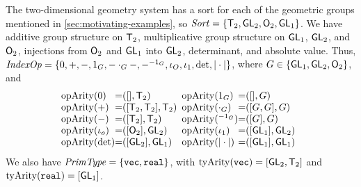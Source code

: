 \begin{example}
  \label{ex:two-dim-geo-operations}
  The two-dimensional geometry system has a sort for each of the
  geometric groups mentioned in \autoref{sec:motivating-examples}, so
  $\mathit{Sort} = \{\mathsf{T}_2, \mathsf{GL}_2, \mathsf{O}_2, \mathsf{GL}_1 \}$.
  We have additive group structure on $\mathsf{T}_2$, multiplicative
  group structure on $\mathsf{GL}_1$, $\mathsf{GL}_2$, and $\mathsf{O}_2$,
  injections from $\mathsf{O}_2$ and $\mathsf{GL}_1$ into $\mathsf{GL}_2$,
  determinant, and absolute value. Thus, $\mathit{IndexOp} = \{ 0, +, -,
  1_G, -\cdot_G-, -^{-1_G}, \iota_O, \iota_1, \det, |\cdot| \}$, where
  $G \in \{\mathsf{GL}_1, \mathsf{GL}_2, \mathsf{O}_2\}$, and
  \begin{displaymath}
    \begin{array}{@{}l@{\hspace{0em}=\hspace{0em}}l@{\hspace{0.5em}}l@{\hspace{0em}=\hspace{0em}}l}
      \indexOpArity(0) & ([], \SynTransl{2}) &
      \indexOpArity(1_G) & ([], G) \\
      \indexOpArity(+) & ([\SynTransl{2}, \SynTransl{2}], \SynTransl{2}) &
      \indexOpArity(\cdot_G) & ([G,G],G) \\
      \indexOpArity(-) & ([\SynTransl{2}], \SynTransl{2}) &
      \indexOpArity(^{-1_G}) & ([G], G) \\
      \indexOpArity(\iota_o) & ([\SynOrth{2}], \SynGL{2}) &
      \indexOpArity(\iota_1) & ([\SynGL{1}], \SynGL{2}) \\
      \indexOpArity(\det) & ([\SynGL{2}], \SynGL{1}) &
      \indexOpArity(|\cdot|) & ([\SynGL{1}], \SynGL{1})
    \end{array}
  \end{displaymath}
We also have $\mathit{PrimType} = \{ \textup{\texttt{vec}},
  \textup{\texttt{real}} \}$, with $\mathrm{tyArity}(\textup{\texttt{vec}}) =
           [\mathsf{GL}_2, \mathsf{T}_2]$ and
           $\mathrm{tyArity}(\textup{\texttt{real}}) = [\mathsf{GL}_1]$.
\end{example}

